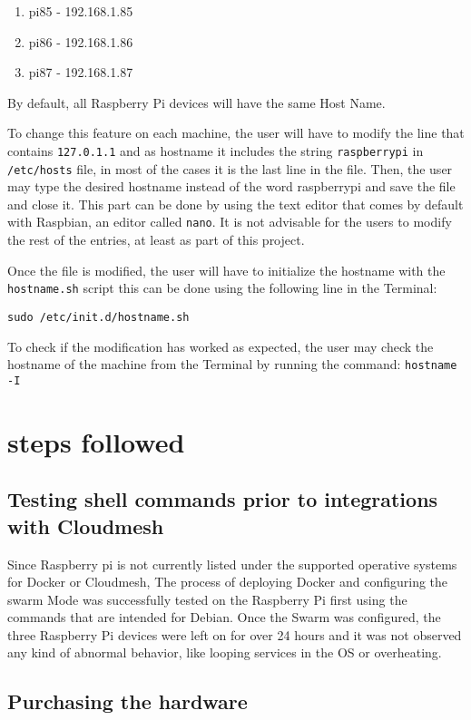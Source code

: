 \begin{enumerate}
	\item pi85 -  192.168.1.85
	\item pi86 -  192.168.1.86
	\item pi87 -  192.168.1.87
\end{enumerate}

By default, all Raspberry Pi devices will have the same Host Name.
	
To change this feature on each machine, the user will have to modify
the line that contains \verb|127.0.1.1| and as hostname
it includes the string \verb|raspberrypi| in
\verb|/etc/hosts| file, in most of the cases it is the
last line in the file. Then, the user may type the desired hostname
instead of the word raspberrypi and save the file and close it. This
part can be done by using the text editor that comes by default with
Raspbian, an editor called \verb|nano|.  It is not
advisable for the users to modify the rest of the entries, at least as
part of this project.
	
Once the file is modified, the user will have to initialize the
hostname with the \verb|hostname.sh| script this can be done using the
following line in the Terminal:
  
\verb|sudo /etc/init.d/hostname.sh|
	
To check if the modification has worked as expected, the user may
check the hostname of the machine from the Terminal by running the
command: \verb|hostname -I|
	
\section{steps followed}
		
\subsection{Testing shell commands prior to integrations with Cloudmesh}
	
Since Raspberry pi is not currently listed under the supported
operative systems for Docker or Cloudmesh, The process of deploying
Docker and configuring the swarm Mode was successfully tested on the
Raspberry Pi first using the commands that are intended for Debian.
Once the Swarm was configured, the three Raspberry Pi devices were
left on for over 24 hours and it was not observed any kind of abnormal
behavior, like looping services in the OS or overheating.
		
\subsection{Purchasing the hardware}
	
